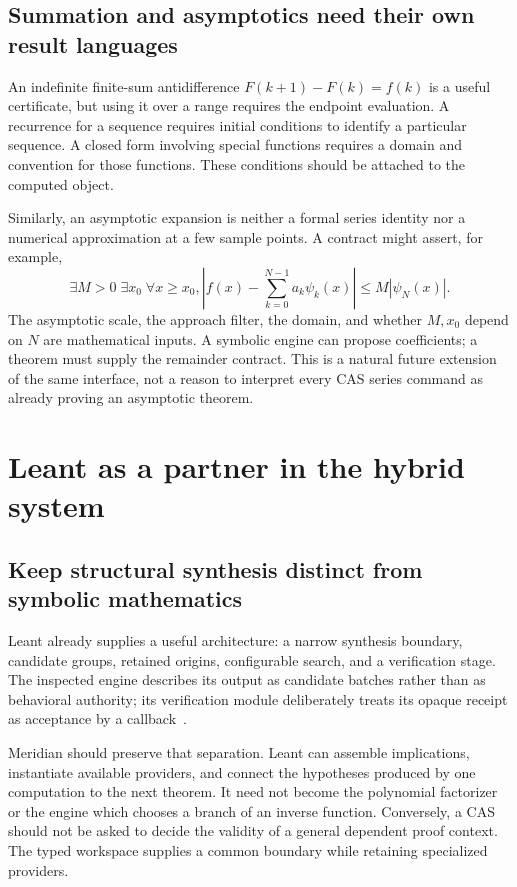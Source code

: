 \documentclass[11pt,a4paper]{article}
\theoremstyle{remark}
\begin{document}
\subsection{Summation and asymptotics need their own result languages}
An indefinite finite-sum antidifference $F(k+1)-F(k)=f(k)$ is a useful certificate,
but using it over a range requires the endpoint evaluation. A recurrence for a
sequence requires initial conditions to identify a particular sequence.
A closed form involving special functions requires a domain and convention for
those functions. These conditions should be attached to the computed object.

Similarly, an asymptotic expansion is neither a formal series identity nor a
numerical approximation at a few sample points. A contract might assert, for
example,
\[
 \exists M>0\;\exists x_0\;\forall x\ge x_0,
 \left|f(x)-\sum_{k=0}^{N-1}a_k\psi_k(x)\right|
 \le M|\psi_N(x)|.
\]
The asymptotic scale, the approach filter, the domain, and whether $M,x_0$ depend
on $N$ are mathematical inputs. A symbolic engine can propose coefficients;
a theorem must supply the remainder contract. This is a natural future extension
of the same interface, not a reason to interpret every CAS series command as
already proving an asymptotic theorem.

\section{Leant as a partner in the hybrid system}
\label{sec:leant}
\subsection{Keep structural synthesis distinct from symbolic mathematics}
Leant already supplies a useful architecture: a narrow synthesis boundary,
candidate groups, retained origins, configurable search, and a verification
stage. The inspected engine describes its output as candidate batches rather
than as behavioral authority; its verification module deliberately treats its
opaque receipt as acceptance by a callback~\cite{lengine,lverify}.

Meridian should preserve that separation. Leant can assemble implications,
instantiate available providers, and connect the hypotheses produced by one
computation to the next theorem. It need not become the polynomial factorizer
or the engine which chooses a branch of an inverse function. Conversely, a CAS
should not be asked to decide the validity of a general dependent proof context.
The typed workspace supplies a common boundary while retaining specialized
providers.
\end{document}
